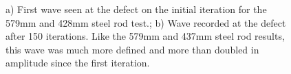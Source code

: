  \begin{figure}
 \begin{subfigmatrix}{2}
 \end{subfigmatrix}
 
    \caption[]
    { \label{fig:steelExp2}
    a) First wave seen at the defect on the initial iteration for the 579mm and 428mm steel rod test.; b) Wave recorded at the defect after 150 iterations. Like the 579mm and 437mm steel rod results, this wave was much more defined and more than doubled in amplitude since the first iteration.
  }
 \end{figure}
 

